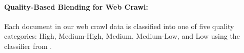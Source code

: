 \documentclass[11pt]{article}
\begin{document}
\paragraph{Quality-Based Blending for Web Crawl:}


Each document in our web crawl data is classified into one of five quality categories: High, Medium-High, Medium, Medium-Low, and Low using the classifier from \citet{su2024nemotroncctransformingcommoncrawl}.







\end{document}
